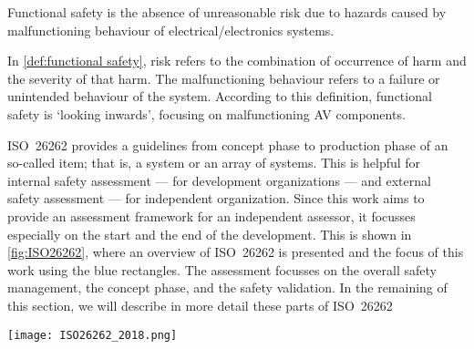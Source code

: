 \begin{definition} \label{def:functional safety}
	Functional safety is the absence of unreasonable risk due to hazards caused by malfunctioning behaviour of electrical/electronics systems.
\end{definition}

In \cref{def:functional safety}, risk refers to the combination of occurrence of harm and the severity of that harm. The malfunctioning behaviour refers to a failure or unintended behaviour of the system. According to this definition, functional safety is `looking inwards', focusing on malfunctioning AV components. 

ISO~26262 provides a guidelines from concept phase to production phase of an so-called item; that is, a system or an array of systems. This is helpful for internal safety assessment --- for development organizations --- and external safety assessment --- for independent organization. Since this work aims to provide an assessment framework for an independent assessor, it focusses especially on the start and the end of the development. This is shown in \cref{fig:ISO26262}, where an overview of ISO~26262 is presented and the focus of this work using the blue rectangles. The assessment focusses on the overall safety management, the concept phase, and the safety validation. In the remaining of this section, we will describe in more detail these parts of ISO~26262

\begin{figure*}[t]
	\centering
	\texttt{[image: ISO26262\_2018.png]}
	\caption{An overview of ISO~26262. The blue rectangles denote the relevant parts for this work. The figure is based on \cite{ISO26262}.}
	\label{fig:ISO26262}
\end{figure*}


